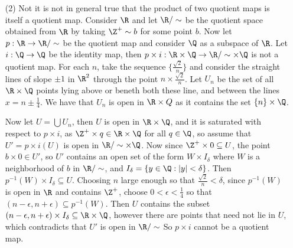 \begin{example}
\begin{enumerate}
        \item[(2)] Not it is not in general true that the product of two quotient maps is itself a
            quotient map. Consider $\R$ and let  $\R/\sim$ be the quotient space obtained from  $\R$
            by taking $\Z^+ \sim b$ for some point  $b$. Now let  $p:\R \rightarrow \R/\sim$ be the
            quotient map and consider  $\Q$ as a subspace of  $\R$. Let  $i:\Q \rightarrow \Q$ be
            the identity map, then  $p \times i:\R \times \Q \rightarrow \R/\sim \times \Q$ is not a
            quotient map. For each  $n$, take the sequence  $\{\frac{\sqrt{2}}{n}\}$ and consider
            the straight lines of slope $\pm1$ in $\R^2$ through the point  $n \times
            \frac{\sqrt{2}}{n}$. Let $U_n$ be the set of all  $\R \times \Q$ points lying above or
            beneth both these line, and between the lines  $x=n \pm \frac{1}{4}$. We have that $U_n$
            is open in  $\R \times Q$ as it contains the set  $\{n\} \times \Q$.

            Now let $U=\bigcup{U_n}$, then $U$ is open in  $\R \times \Q$, and it is saturated with
            respect to  $p \times i$, as  $\Z^+ \times q \in \R \times \Q$ for all  $q \in \Q$, so
            assume that  $U'=p \times i(U)$ is open in $\R/\sim \times \Q$. Now since  $\Z^+ \times
            0 \subseteq U$, the point  $b \times 0 \in U'$, so  $U'$ contains an open set of the
            form  $W \times I_{\delta}$ where $W$ is a neighborhood of  $b$ in  $\R/\sim$, and
            $I_{\delta}=\{y \in \Q:|y|<\delta\}$. Then $p^{-1}(W) \times I_{\delta} \subseteq U$.
            Choosing $n$ large enough so that  $ \frac{\sqrt{2}}{n}<\delta$, since $p^{-1}(W)$ is
            open in $\R$ and contains  $\Z^+$, choose  $0<\epsilon<\frac{1}{4}$ so that
            $(n-\epsilon,n+\epsilon) \subseteq p^{-1}(W)$. Then $U$ contains the subset
            $(n-\epsilon,n+\epsilon) \times I_{\delta} \subseteq \R \times \Q$, however there are
            points that need not lie in $U$, which contradicts that  $U'$ is open in $\R/\sim$ So
            $p \times i$ cannot be a quotient map.
    \end{enumerate}
\end{example}
